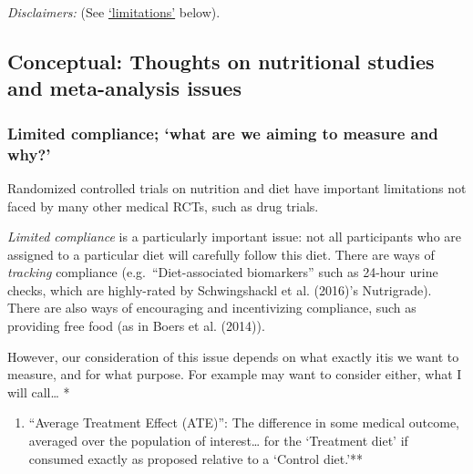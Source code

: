 \documentclass[]{tufte-handout}
\providecommand{\tightlist}{%
  \setlength{\itemsep}{0pt}\setlength{\parskip}{0pt}}
\begin{document}
\emph{Disclaimers:} (See \protect\hyperlink{limitations}{`limitations'}
below).

\hypertarget{conceptual}{%
\subsection{Conceptual: Thoughts on nutritional studies and
meta-analysis issues}\label{conceptual}}

\hypertarget{compliance}{%
\subsubsection{Limited compliance; `what are we aiming to measure and
why?'}\label{compliance}}

Randomized controlled trials on nutrition and diet have important
limitations not faced by many other medical RCTs, such as drug trials.

\emph{Limited compliance} is a particularly important issue: not all
participants who are assigned to a particular diet will carefully follow
this diet. There are ways of \emph{tracking} compliance
(e.g.~``Diet-associated biomarkers'' such as 24-hour urine checks, which
are highly-rated by Schwingshackl et al. (2016)'s Nutrigrade). There are
also ways of encouraging and incentivizing compliance, such as providing
free food (as in Boers et al. (2014)).

However, our consideration of this issue depends on what exactly itis we
want to measure, and for what purpose. For example may want to consider
either, what I will call\ldots{} *


\begin{enumerate}
\def\labelenumi{\arabic{enumi}.}
\tightlist
\item
  ``Average Treatment Effect (ATE)'': The difference in some medical
  outcome, averaged over the population of interest\ldots{} for the
  `Treatment diet' if consumed exactly as proposed relative to a
  `Control diet.'**
\end{enumerate}
\end{document}
